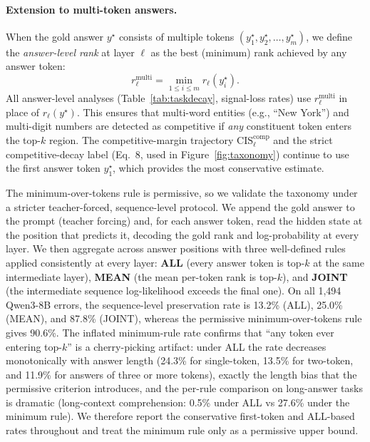 \documentclass{article} %
\begin{document}
\paragraph{Extension to multi-token answers.}
When the gold answer $y^\star$ consists of multiple tokens $(y^\star_1, y^\star_2, \ldots, y^\star_m)$, we define the \emph{answer-level rank} at layer $\ell$ as the best (minimum) rank achieved by any answer token:
\begin{equation}
r^{\mathrm{multi}}_\ell = \min_{1 \le i \le m} r_\ell(y^\star_i) .
\end{equation}
All answer-level analyses (Table~\ref{tab:taskdecay}, signal-loss rates) use $r^{\mathrm{multi}}_\ell$ in place of $r_\ell(y^\star)$. This ensures that multi-word entities (e.g., ``New York'') and multi-digit numbers are detected as competitive if \emph{any} constituent token enters the top-$k$ region. The competitive-margin trajectory $\mathrm{CIS}^{\mathrm{comp}}_\ell$ and the strict competitive-decay label (Eq.~8, used in Figure~\ref{fig:taxonomy}) continue to use the first answer token $y^\star_1$, which provides the most conservative estimate.

The minimum-over-tokens rule is permissive, so we validate the taxonomy under a stricter teacher-forced, sequence-level protocol. We append the gold answer to the prompt (teacher forcing) and, for each answer token, read the hidden state at the position that predicts it, decoding the gold rank and log-probability at every layer. We then aggregate across answer positions with three well-defined rules applied consistently at every layer: \textbf{ALL} (every answer token is top-$k$ at the same intermediate layer), \textbf{MEAN} (the mean per-token rank is top-$k$), and \textbf{JOINT} (the intermediate sequence log-likelihood exceeds the final one). On all 1{,}494 Qwen3-8B errors, the sequence-level preservation rate is 13.2\% (ALL), 25.0\% (MEAN), and 87.8\% (JOINT), whereas the permissive minimum-over-tokens rule gives 90.6\%. The inflated minimum-rule rate confirms that ``any token ever entering top-$k$'' is a cherry-picking artifact: under ALL the rate decreases monotonically with answer length (24.3\% for single-token, 13.5\% for two-token, and 11.9\% for answers of three or more tokens), exactly the length bias that the permissive criterion introduces, and the per-rule comparison on long-answer tasks is dramatic (long-context comprehension: 0.5\% under ALL vs 27.6\% under the minimum rule). We therefore report the conservative first-token and ALL-based rates throughout and treat the minimum rule only as a permissive upper bound.
\end{document}
